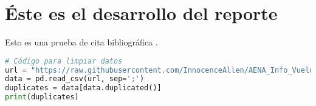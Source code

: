 \section{Éste es el desarrollo del reporte}


Esto es una prueba de cita bibliográfica \parencite{Ley28518}.

\begin{lstlisting}[caption={Código en Python para detectar duplicados}, language=python]
# Código para limpiar datos
url = "https://raw.githubusercontent.com/InnocenceAllen/AENA_Info_Vuelos/master/infovuelos_sample.csv"
data = pd.read_csv(url, sep=';')
duplicates = data[data.duplicated()]
print(duplicates)
\end{lstlisting}